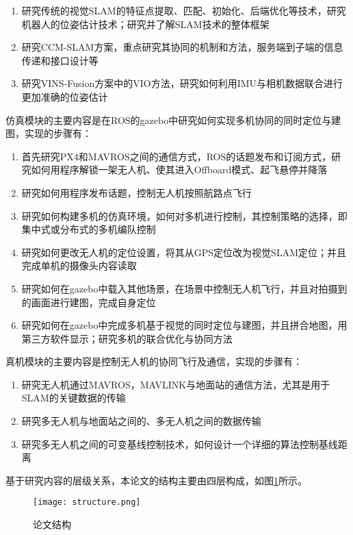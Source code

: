 \begin{enumerate}
	\item 研究传统的视觉SLAM的特征点提取、匹配、初始化、后端优化等技术，研究机器人的位姿估计技术；研究并了解SLAM技术的整体框架
	\item 研究CCM-SLAM方案，重点研究其协同的机制和方法，服务端到子端的信息传递和接口设计等
	\item 研究VINS-Fusion方案中的VIO方法，研究如何利用IMU与相机数据联合进行更加准确的位姿估计
\end{enumerate}

仿真模块的主要内容是在ROS的gazebo中研究如何实现多机协同的同时定位与建图，实现的步骤有：

\begin{enumerate}
	\item 首先研究PX4和MAVROS之间的通信方式，ROS的话题发布和订阅方式，研究如何用程序解锁一架无人机、使其进入Offboard模式、起飞悬停并降落
	\item 研究如何用程序发布话题，控制无人机按照航路点飞行
	\item 研究如何构建多机的仿真环境，如何对多机进行控制，其控制策略的选择，即集中式或分布式的多机编队控制
	\item 研究如何更改无人机的定位设置，将其从GPS定位改为视觉SLAM定位；并且完成单机的摄像头内容读取
	\item 研究如何在gazebo中载入其他场景，在场景中控制无人机飞行，并且对拍摄到的画面进行建图，完成自身定位
	\item 研究如何在gazebo中完成多机基于视觉的同时定位与建图，并且拼合地图，用第三方软件显示；研究多机的联合优化与协同方法
\end{enumerate}

真机模块的主要内容是控制无人机的协同飞行及通信，实现的步骤有：

\begin{enumerate}
	\item 研究无人机通过MAVROS，MAVLINK与地面站的通信方法，尤其是用于SLAM的关键数据的传输
	\item 研究多无人机与地面站之间的、多无人机之间的数据传输
	\item 研究多无人机之间的可变基线控制技术，如何设计一个详细的算法控制基线距离
\end{enumerate}

基于研究内容的层级关系，本论文的结构主要由四层构成，如图\ref{fig1}所示。
\vspace{10pt}
\begin{figure}[!ht]
\centering
\texttt{[image: structure.png]}
\caption{论文结构 }
\label{fig1}
\end{figure}



